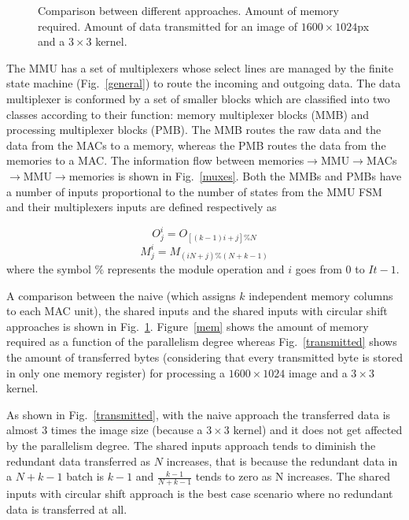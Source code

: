 \documentclass[conference,compsoc]{IEEEtran}
\begin{document}
\begin{figure}[!t]
{\label{transmitted}}
\caption{Comparison between different approaches. \protect{} Amount of
  memory required. \protect{} Amount of data transmitted for an image of $1600\times1024$px and a $3\times3$ kernel.}
\label{comp}
\end{figure}

The MMU has a set of multiplexers whose select lines are managed by the finite
state machine (Fig.~\ref{general}) to route the incoming and outgoing data. The
data multiplexer is conformed by a set of smaller blocks which are classified
into two classes according to their function: memory multiplexer blocks (MMB)
and processing multiplexer blocks (PMB). The MMB routes the raw data and the
data from the MACs to a memory, whereas the PMB routes the data from the memories
to a MAC. The information flow between
memories$\rightarrow$MMU$\rightarrow$MACs$\rightarrow$MMU$\rightarrow$memories
is shown in Fig.~\ref{muxes}. Both the MMBs and PMBs have a number of inputs
proportional to the number of states from the MMU FSM and their multiplexers
inputs are defined respectively as

\begin{equation}%
  O_j^i = O_{[(k-1)i+j]\%N}
\end{equation}
\begin{equation}%
  M_j^i = M_{(iN+j)\%(N+k-1)}
\end{equation}
where the symbol $\%$ represents the module operation and $i$ goes from $0$ to $It-1$.

A comparison between the naive (which assigns $k$ independent
memory columns to each MAC unit), the shared inputs and the
shared inputs with circular shift approaches is shown in Fig.~\ref{comp}.
Figure~\ref{mem} shows the amount of memory required as a function of the
parallelism degree whereas Fig.~\ref{transmitted} shows the amount of transferred
bytes (considering that every transmitted byte is stored in only one memory
register) for processing a $1600\times1024$ image and a $3\times3$ kernel.

As shown in Fig.~\ref{transmitted}, with the naive approach the transferred data is
almost $3$ times the image size (because a $3\times3$ kernel) and it does not
get affected by the parallelism degree. The shared inputs approach tends to
diminish the redundant data transferred as $N$ increases, that is because the
redundant data in a $N+k-1$ batch is $k-1$ and $\frac{k-1}{N+k-1}$ tends to zero
as N increases. The shared inputs with circular shift approach is the best case
scenario where no redundant data is transferred at all.
\end{document}
